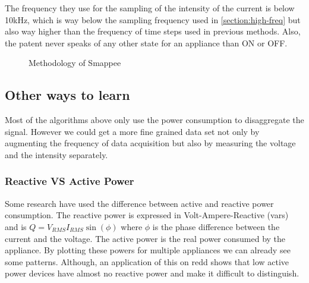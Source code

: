The frequency they use for the sampling of the intensity of the current is below 10kHz, which is way below the sampling frequency used in \autoref{section:high-freq} but also way higher than the frequency of time steps used in previous methods. Also, the patent never speaks of any other state for an appliance than ON or OFF.
\begin{figure}
    \centering
    \caption{Methodology of Smappee}
    \label{fig:smappe}
\end{figure}


\subsection{Other ways to learn}
Most of the algorithms above only use the power consumption to disaggregate the signal. However we could get a more fine grained data set not only by augmenting the frequency of data acquisition but also by measuring the voltage and the intensity separately.


\subsubsection{Reactive VS Active Power}
Some research \cite{hassan2014empirical} have used the difference between active and reactive power consumption. The reactive power is expressed in Volt-Ampere-Reactive (vars) and is $Q=V_{RMS}I_{RMS}\sin(\phi)$ where $\phi$ is the phase difference between the current and the voltage. The active power is the real power consumed by the appliance. By plotting these powers for multiple appliances we can already see some patterns. Although, an application of this on \acrshort{redd} shows that low active power devices have almost no reactive power and make it difficult to distinguish.

